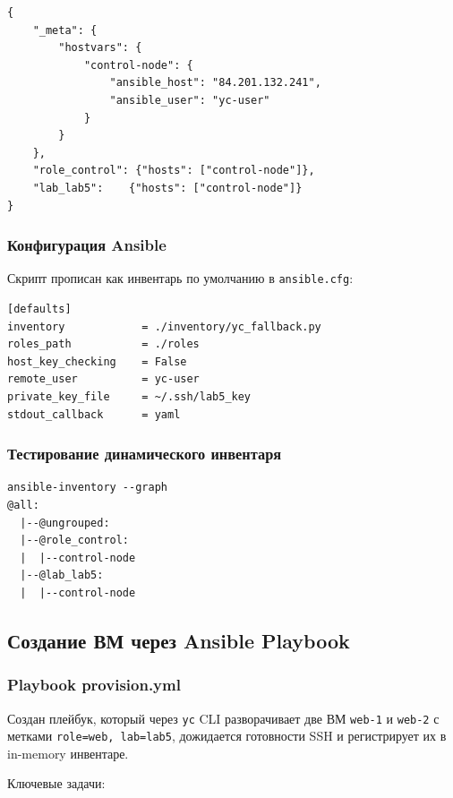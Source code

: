 \documentclass[12pt,a4paper]{article}
\begin{document}
\begin{lstlisting}
{
    "_meta": {
        "hostvars": {
            "control-node": {
                "ansible_host": "84.201.132.241",
                "ansible_user": "yc-user"
            }
        }
    },
    "role_control": {"hosts": ["control-node"]},
    "lab_lab5":    {"hosts": ["control-node"]}
}
\end{lstlisting}

\subsubsection{Конфигурация Ansible}

Скрипт прописан как инвентарь по умолчанию в \texttt{ansible.cfg}:

\begin{lstlisting}
[defaults]
inventory            = ./inventory/yc_fallback.py
roles_path           = ./roles
host_key_checking    = False
remote_user          = yc-user
private_key_file     = ~/.ssh/lab5_key
stdout_callback      = yaml
\end{lstlisting}

\subsubsection{Тестирование динамического инвентаря}

\begin{lstlisting}
ansible-inventory --graph
@all:
  |--@ungrouped:
  |--@role_control:
  |  |--control-node
  |--@lab_lab5:
  |  |--control-node
\end{lstlisting}

\subsection{Создание ВМ через Ansible Playbook}

\subsubsection{Playbook provision.yml}

Создан плейбук, который через \texttt{yc} CLI разворачивает две ВМ \texttt{web-1} и \texttt{web-2} с метками \texttt{role=web, lab=lab5}, дожидается готовности SSH и регистрирует их в in-memory инвентаре.

Ключевые задачи:
\end{document}
